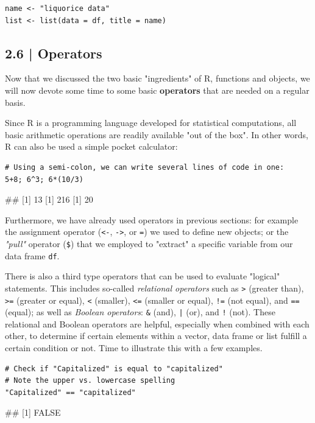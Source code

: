 \begin{lstlisting}
name <- "liquorice data"
list <- list(data = df, title = name)
\end{lstlisting}

\subsection{{\normalfont\textsf{\textcolor{sBlue}{\small 2.6 |}}} Operators}

Now that we discussed the two basic "ingredients" of \textsf{R}, functions and objects, we will now devote some time to some basic \textbf{operators} that are needed on a regular basis. 

Since \textsf{R} is a programming language developed for statistical computations, all basic arithmetic operations are readily available "out of the box". In other words, \textsf{R} can also be used a simple pocket calculator:

\begin{lstlisting}
# Using a semi-colon, we can write several lines of code in one:
5+8; 6^3; 6*(10/3) 
\end{lstlisting}
\begin{example}
## [1] 13     [1] 216     [1] 20
\end{example}

Furthermore, we have already used operators in previous sections: for example the assignment operator (\texttt{<-}, \texttt{->}, or \texttt{=}) we used to define new objects; or the \emph{"pull"} operator (\texttt{\$}) that we employed to "extract" a specific variable from our data frame \texttt{df}.

There is also a third type operators that can be used to evaluate "logical" statements. This includes so-called \emph{relational operators} such as \texttt{>} (greater than), \texttt{>=} (greater or equal), \texttt{<} (smaller), \texttt{<=} (smaller or equal), \texttt{!=} (not equal), and \texttt{==} (equal); as well as \emph{Boolean operators}: \texttt{\&} (and), \texttt{|} (or), and \texttt{!} (not). These relational and Boolean operators are helpful, especially when combined with each other, to determine if certain elements within a vector, data frame or list fulfill a certain condition or not. Time to illustrate this with a few examples.

\begin{lstlisting}
# Check if "Capitalized" is equal to "capitalized" 
# Note the upper vs. lowercase spelling
"Capitalized" == "capitalized"
\end{lstlisting}
\begin{example}
## [1] FALSE
\end{example}


